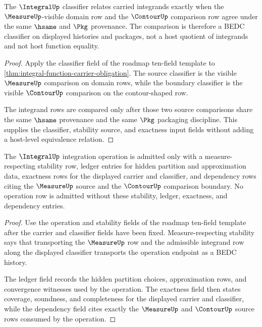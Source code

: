 \begin{theorem}\label{thm:integral-measure-respecting-classifier-obligation}
The $\IntegralUp$ classifier relates carried integrands exactly when the $\MeasureUp$-visible domain row and the $\ContourUp$ comparison row agree under the same $\hsame$ and $\Pkg$ provenance. The comparison is therefore a BEDC classifier on displayed histories and packages, not a host quotient of integrands and not host function equality.
\end{theorem}
\begin{proof}
Apply the classifier field of the roadmap ten-field template to \autoref{thm:integral-function-carrier-obligation}. The source classifier is the visible $\MeasureUp$ comparison on domain rows, while the boundary classifier is the visible $\ContourUp$ comparison on the contour-shaped row.

The integrand rows are compared only after those two source comparisons share the same $\hsame$ provenance and the same $\Pkg$ packaging discipline. This supplies the classifier, stability source, and exactness input fields without adding a host-level equivalence relation.
\end{proof}

\begin{theorem}\label{thm:integral-operation-stability-ledger-obligation}
The $\IntegralUp$ integration operation is admitted only with a measure-respecting stability row, ledger entries for hidden partition and approximation data, exactness rows for the displayed carrier and classifier, and dependency rows citing the $\MeasureUp$ source and the $\ContourUp$ comparison boundary. No operation row is admitted without these stability, ledger, exactness, and dependency entries.
\end{theorem}
\begin{proof}
Use the operation and stability fields of the roadmap ten-field template after the carrier and classifier fields have been fixed. Measure-respecting stability says that transporting the $\MeasureUp$ row and the admissible integrand row along the displayed classifier transports the operation endpoint as a BEDC history.

The ledger field records the hidden partition choices, approximation rows, and convergence witnesses used by the operation. The exactness field then states coverage, soundness, and completeness for the displayed carrier and classifier, while the dependency field cites exactly the $\MeasureUp$ and $\ContourUp$ source rows consumed by the operation.
\end{proof}

